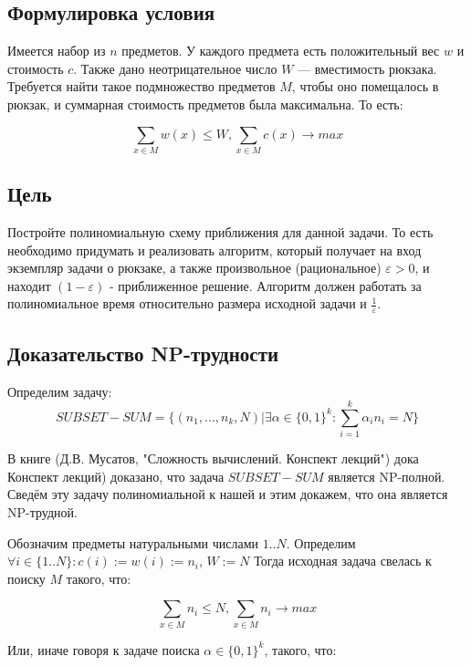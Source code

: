\documentclass{article}
\begin{document}
	\subsection{Формулировка условия}


Имеется набор из $n$ предметов. У каждого предмета есть положительный вес $w$ и стоимость $c$. Также дано неотрицательное число $W$ — вместимость рюкзака.
Требуется найти такое подмножество предметов $M$, чтобы оно помещалось в рюкзак, и суммарная стоимость предметов была максимальна. То есть:

$$\sum\limits_{x \in M} {w(x)} \leq W, \sum\limits_{x \in M} {c(x)} \rightarrow max$$ 

	\subsection{Цель}

Постройте полиномиальную схему приближения для данной задачи. То есть необходимо придумать и реализовать алгоритм, который получает на вход экземпляр задачи о рюкзаке, а также произвольное (рациональное) $\varepsilon > 0$, и находит $(1 - \varepsilon)$ - приближенное решение. Алгоритм должен работать за полиномиальное время относительно размера исходной задачи и $\frac{1}{\varepsilon}$.

	\subsection{Доказательство NP-трудности}
 
Определим задачу: $$SUBSET-SUM = \{(n_1 , . . . , n_k , N ) | \exists \alpha \in \{0, 1\}^k : \sum\limits_{i = 1}^{k} {\alpha_i n_i} = N \}$$  

В книге (Д.В. Мусатов, "Сложность вычислений. Конспект лекций") дока
Конспект лекций) доказано, что задача $SUBSET-SUM$ является NP-полной. Сведём эту задачу полиномиальной к нашей и этим докажем, что она является NP-трудной. 
 
Обозначим предметы натуральными числами $1 .. N$. Определим $\forall i \in \{1..N\} : c(i) := w(i) := n_i$, $W := N$ Тогда исходная задача свелась к поиску $M$ такого, что:

$$\sum\limits_{x \in M} {n_i} \leq N, \sum\limits_{x \in M} {n_i} \rightarrow max$$ 
 
Или, иначе говоря к задаче поиска $\alpha \in \{0, 1\}^k$, такого, что:
\end{document}
